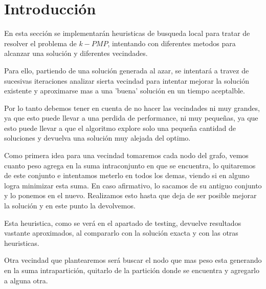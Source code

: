 \section{Introducci\'on}

En esta sección se implementarán heuristicas de busqueda local para tratar de resolver el problema de $k-PMP$, intentando con diferentes metodos para alcanzar una solución y diferentes vecindades.

Para ello, partiendo de una solución generada al azar, se intentará a travez de sucesivas iteraciones analizar sierta vecindad para intentar mejorar la solución existente y aproximarse mas a una 'buena' solución en un tiempo aceptalble. 

Por lo tanto debemos tener en cuenta de no hacer las vecindades ni muy grandes, ya que esto puede llevar a una perdida de performance, ni muy pequeñas, ya que esto puede llevar a que el algoritmo explore solo una pequeña cantidad de soluciones y devuelva una solución muy alejada del optimo.

Como primera idea para una vecindad tomaremos cada nodo del grafo, vemos cuanto peso agrega en la suma intraconjunto en que se encuentra, lo quitaremos de este conjunto e intentamos meterlo en todos los demas, viendo si en alguno logra minimizar esta suma. En caso afirmativo, lo sacamos de su antiguo conjunto y lo ponemos en el nuevo. Realizamos esto hasta que deja de ser posible mejorar la solución y en este punto la devolvemos.

Esta heuristica, como se verá en el apartado de testing, devuelve resultados vastante aproximados, al compararlo con la solución exacta y con las otras heuristicas.

Otra vecindad que plantearemos será buscar el nodo que mas peso esta generando en la suma intrapartición, quitarlo de la partición donde se encuentra y agregarlo a alguna otra. 
